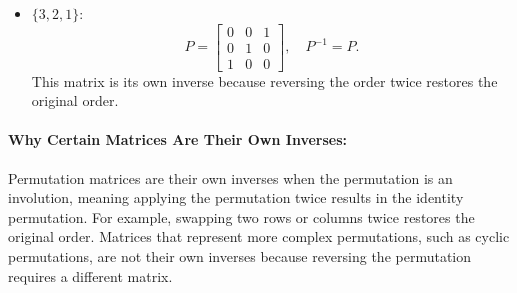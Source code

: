 \documentclass{article}
\begin{document}
\begin{itemize}
    \item $\{3, 2, 1\}$:
    \[
    P = \begin{bmatrix}
    0 & 0 & 1 \\
    0 & 1 & 0 \\
    1 & 0 & 0
    \end{bmatrix}, \quad P^{-1} = P.
    \]
    This matrix is its own inverse because reversing the order twice restores the original order.
\end{itemize}

\paragraph{Why Certain Matrices Are Their Own Inverses:}
Permutation matrices are their own inverses when the permutation is an involution, meaning applying the permutation twice results in the identity permutation. For example, swapping two rows or columns twice restores the original order. Matrices that represent more complex permutations, such as cyclic permutations, are not their own inverses because reversing the permutation requires a different matrix.
\end{document}
